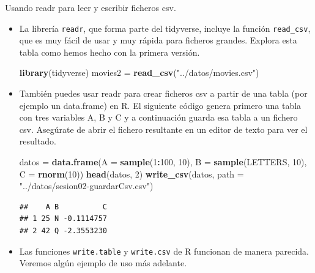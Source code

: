 \documentclass[
  9pt,
  ignorenonframetext,
]{beamer}
\newenvironment{Shaded}{\begin{snugshade}}{\end{snugshade}}
\newcommand{\DataTypeTok}[1]{\textcolor[rgb]{0.13,0.29,0.53}{#1}}
\newcommand{\DecValTok}[1]{\textcolor[rgb]{0.00,0.00,0.81}{#1}}
\newcommand{\KeywordTok}[1]{\textcolor[rgb]{0.13,0.29,0.53}{\textbf{#1}}}
\newcommand{\NormalTok}[1]{#1}
\newcommand{\OperatorTok}[1]{\textcolor[rgb]{0.81,0.36,0.00}{\textbf{#1}}}
\newcommand{\StringTok}[1]{\textcolor[rgb]{0.31,0.60,0.02}{#1}}
\providecommand{\tightlist}{%
  \setlength{\itemsep}{0pt}\setlength{\parskip}{0pt}}
\begin{document}
\begin{frame}[fragile]{Usando readr para leer y escribir ficheros csv.}
\protect\hypertarget{usando-readr-para-leer-y-escribir-ficheros-csv.}{}

\begin{itemize}
\item
  La librería \texttt{readr}, que forma parte del tidyverse, incluye la
  función \texttt{read\_csv}, que es muy fácil de usar y muy rápida para
  ficheros grandes. Explora esta tabla como hemos hecho con la primera
  versión.\\
  \small

\begin{Shaded}
\begin{Highlighting}[]
\KeywordTok{library}\NormalTok{(tidyverse)}
\NormalTok{movies2 =}\StringTok{ }\KeywordTok{read_csv}\NormalTok{(}\StringTok{"../datos/movies.csv"}\NormalTok{)}
\end{Highlighting}
\end{Shaded}
\end{itemize}

\normalsize

\begin{itemize}
\item
  También puedes usar readr para crear ficheros csv a partir de una
  tabla (por ejemplo un data.frame) en R. El siguiente código genera
  primero una tabla con tres variables A, B y C y a continuación guarda
  esa tabla a un fichero csv. Asegúrate de abrir el fichero resultante
  en un editor de texto para ver el resultado. \small

\begin{Shaded}
\begin{Highlighting}[]
\NormalTok{datos =}\StringTok{ }
\StringTok{  }\KeywordTok{data.frame}\NormalTok{(}\DataTypeTok{A =} \KeywordTok{sample}\NormalTok{(}\DecValTok{1}\OperatorTok{:}\DecValTok{100}\NormalTok{, }\DecValTok{10}\NormalTok{), }\DataTypeTok{B =} \KeywordTok{sample}\NormalTok{(LETTERS, }\DecValTok{10}\NormalTok{), }\DataTypeTok{C =} \KeywordTok{rnorm}\NormalTok{(}\DecValTok{10}\NormalTok{))}
\KeywordTok{head}\NormalTok{(datos, }\DecValTok{2}\NormalTok{)}
\KeywordTok{write_csv}\NormalTok{(datos, }\DataTypeTok{path =} \StringTok{"../datos/sesion02-guardarCsv.csv"}\NormalTok{)}
\end{Highlighting}
\end{Shaded}

\begin{verbatim}
##    A B          C
## 1 25 N -0.1114757
## 2 42 Q -2.3553230
\end{verbatim}
\end{itemize}

\normalsize

\begin{itemize}
\tightlist
\item
  Las funciones \texttt{write.table} y \texttt{write.csv} de R funcionan
  de manera parecida. Veremos algún ejemplo de uso más adelante.
\end{itemize}

\end{frame}
\end{document}

